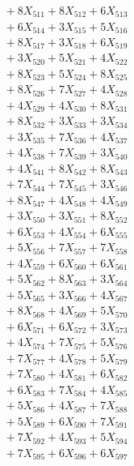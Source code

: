 \documentclass[a4paper,10pt]{article}
\begin{document}
{\begin{align}
&\;  + 8 X_{511} + 8 X_{512} + 6 X_{513} \\[0.3ex]
&\;  + 6 X_{514} + 3 X_{515} + 5 X_{516} \\[0.3ex]
&\;  + 8 X_{517} + 3 X_{518} + 6 X_{519} \\[0.5ex]\allowbreak
&\;  + 3 X_{520} + 5 X_{521} + 4 X_{522} \\[0.3ex]
&\;  + 8 X_{523} + 5 X_{524} + 8 X_{525} \\[0.3ex]
&\;  + 8 X_{526} + 7 X_{527} + 4 X_{528} \\[0.3ex]
&\;  + 4 X_{529} + 4 X_{530} + 8 X_{531} \\[0.3ex]
&\;  + 8 X_{532} + 3 X_{533} + 3 X_{534} \\[0.3ex]
&\;  + 3 X_{535} + 7 X_{536} + 4 X_{537} \\[0.3ex]
&\;  + 4 X_{538} + 7 X_{539} + 3 X_{540} \\[0.3ex]
&\;  + 4 X_{541} + 8 X_{542} + 8 X_{543} \\[0.3ex]
&\;  + 7 X_{544} + 7 X_{545} + 3 X_{546} \\[0.3ex]
&\;  + 8 X_{547} + 4 X_{548} + 4 X_{549} \\[0.5ex]\allowbreak
&\;  + 3 X_{550} + 3 X_{551} + 8 X_{552} \\[0.3ex]
&\;  + 6 X_{553} + 4 X_{554} + 6 X_{555} \\[0.3ex]
&\;  + 5 X_{556} + 7 X_{557} + 7 X_{558} \\[0.3ex]
&\;  + 4 X_{559} + 6 X_{560} + 6 X_{561} \\[0.3ex]
&\;  + 5 X_{562} + 8 X_{563} + 3 X_{564} \\[0.3ex]
&\;  + 5 X_{565} + 3 X_{566} + 4 X_{567} \\[0.3ex]
&\;  + 8 X_{568} + 4 X_{569} + 5 X_{570} \\[0.3ex]
&\;  + 6 X_{571} + 6 X_{572} + 3 X_{573} \\[0.3ex]
&\;  + 4 X_{574} + 7 X_{575} + 5 X_{576} \\[0.3ex]
&\;  + 7 X_{577} + 4 X_{578} + 5 X_{579} \\[0.5ex]\allowbreak
&\;  + 7 X_{580} + 4 X_{581} + 6 X_{582} \\[0.3ex]
&\;  + 6 X_{583} + 7 X_{584} + 4 X_{585} \\[0.3ex]
&\;  + 5 X_{586} + 4 X_{587} + 7 X_{588} \\[0.3ex]
&\;  + 5 X_{589} + 6 X_{590} + 7 X_{591} \\[0.3ex]
&\;  + 7 X_{592} + 4 X_{593} + 5 X_{594} \\[0.3ex]
&\;  + 7 X_{595} + 6 X_{596} + 6 X_{597} \\[0.3ex]

\end{align}}
\end{document}
